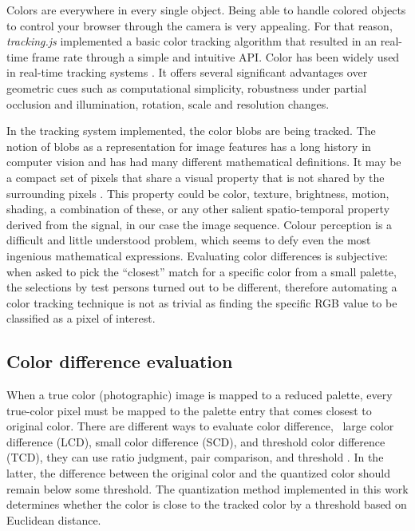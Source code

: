 Colors are everywhere in every single object. Being able to handle colored objects to control your browser through the camera is very appealing. For that reason, \textit{tracking.js} implemented a basic color tracking algorithm that resulted in an real-time frame rate through a simple and intuitive API.
Color has been widely used in real-time tracking systems \cite{Paschos2001}. It offers several significant advantages over geometric cues such as computational simplicity, robustness under partial occlusion and illumination, rotation, scale and resolution changes.

In the tracking system implemented, the color blobs are being tracked. The notion of blobs as a representation for image features has a long history in computer vision and has had many different mathematical definitions. It may be a compact set of pixels that share a visual property that is not shared by the surrounding pixels \cite{Kravtchenko1999}. This property could be color, texture, brightness, motion, shading, a combination of these, or any other salient spatio-temporal property derived from the signal, in our case the image sequence.
Colour perception is a difficult and little understood problem, which seems to defy even the most ingenious mathematical expressions. Evaluating color differences is subjective: when asked to pick the ``closest'' match for a specific color from a small palette, the selections by test persons turned out to be different, therefore automating a color tracking technique is not as trivial as finding the specific RGB \cite{Gonzalez2007} value to be classified as a pixel of interest.


\subsection{Color difference evaluation} %
\label{sub:tracking_library_for_the_web:color_tracking_algorithm:color_difference_evaluation}

When a true color (photographic) image is mapped to a reduced palette, every true-color pixel must be mapped to the palette entry that comes closest to original color.
There are different ways to evaluate color difference, \ie\ large color difference (LCD), small color difference (SCD), and threshold color difference (TCD), they can use ratio judgment, pair comparison, and threshold \cite{Li2003}. In the latter, the difference between the original color and the quantized color should remain below some threshold. The quantization method implemented in this work determines whether the color is close to the tracked color by a threshold based on Euclidean distance.

